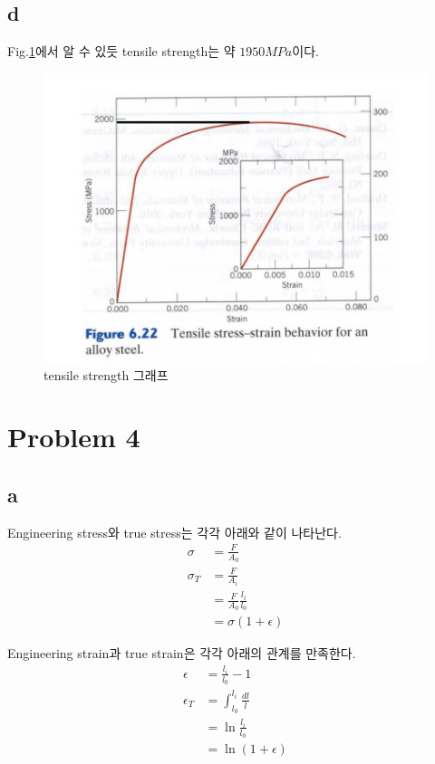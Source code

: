 \documentclass[a4paper]{oblivoir}
\begin{document}
\subsection{d}
Fig.\ref{fig:p3d}에서 알 수 있듯 tensile strength는 약 $1950MPa$이다.
\begin{figure}[h]
    \centering
    \includegraphics[width=0.5\linewidth]{p3d.png}
    \caption{\label{fig:p3d} tensile strength 그래프}
\end{figure}

\section{Problem 4}
\subsection{a}
Engineering stress와 true stress는 각각 아래와 같이 나타난다.
\begin{align}
	\sigma &= \frac{F}{A_{0}}\\
	\sigma_{T} &= \frac{F}{A_{i}}\\
	&= \frac{F}{A_{0}}\frac{l_{i}}{l_{0}}\\
	&= \sigma (1+\epsilon)
\end{align}

Engineering strain과 true strain은 각각 아래의 관계를 만족한다.
\begin{align}
	\epsilon &= \frac{l_{i}}{l_{0}}-1\\
	\epsilon_{T} &= \int_{l_{0}}^{l_{i}}\frac{dl}{l}\\
	&= \ln{\frac{l_{i}}{l_{0}}}\\
	&= \ln{(1+\epsilon)}
\end{align}
\end{document}
